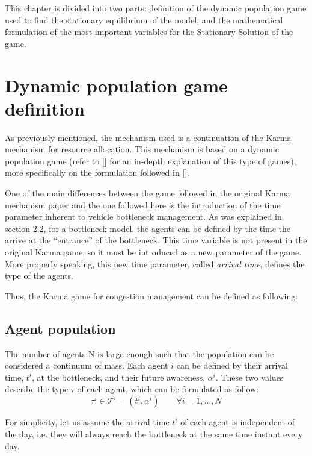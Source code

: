 \documentclass[a4paper,11pt,twoside]{book}
\let\oldcite\cite
\renewcommand*\cite[1]{{[\oldcite{#1}]}}
\begin{document}
This chapter is divided into two parts: definition of the dynamic population game used to find the stationary equilibrium of the model, and the mathematical formulation of the most important variables for the Stationary Solution of the game.


\section{Dynamic population game definition}

As previously mentioned, the mechanism used is a continuation of the Karma mechanism for resource allocation. This mechanism is based on a dynamic population game (refer to \cite{DynPopGame} for an in-depth explanation of this type of games), more specifically on the formulation followed in \cite{KarmaGame}. 

One of the main differences between the game followed in the original Karma mechanism paper and the one followed here is the introduction of the time parameter inherent to vehicle bottleneck management. As was explained in section 2.2, for a bottleneck model, the agents can be defined by the time the arrive at the ``entrance'' of the bottleneck. This time variable is not present in the original Karma game, so it must be introduced as a new parameter of the game. More properly speaking, this new time parameter, called \textit{arrival time}, defines the type of the agents.

Thus, the Karma game for congestion management can be defined as following:

\subsection{Agent population}

The number of agents N is large enough such that the population can be considered a continuum of mass. Each agent $i$ can be defined by their arrival time, $t^i$, at the bottleneck, and their future awareness, $\alpha^i$. These two values describe the type $\tau$ of each agent, which can be formulated as follow:
\begin{equation*}
    \tau^i \in \mathcal{T}^i = (t^i, \alpha^i) \qquad \forall i = 1, ..., N
\end{equation*}

For simplicity, let us assume the arrival time $t^i$ of each agent is independent of the day, i.e. they will always reach the bottleneck at the same time instant every day.
\end{document}
